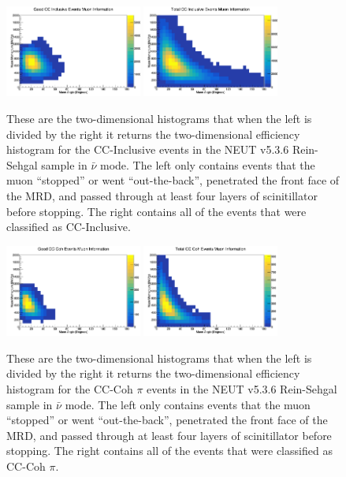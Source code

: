 \documentclass[11pt]{article}
\begin{document}
\begin{figure}[H]
\centering
\includegraphics[width=0.4\textwidth]{NewANMReinSehgalImages/6-GoodCCCohMuonInfoANMRS.png}
\includegraphics[width=0.4\textwidth]{NewANMReinSehgalImages/9-TotalCCCohMuonInfoANMRS.png}
\caption{These are the two-dimensional histograms that when the left is divided by the right it returns the two-dimensional efficiency histogram for the CC-Inclusive events in the NEUT v5.3.6 Rein-Sehgal sample in $\bar{\nu}$ mode. The left only contains events that the muon ``stopped'' or went ``out-the-back'', penetrated the front face of the MRD, and passed through at least four layers of scinitillator before stopping. The right contains all of the events that were classified as CC-Inclusive.}
\label{fig:app:ANMCCInclusiveMuon2DRS}
\end{figure}

\begin{figure}[H]
\centering
\includegraphics[width=0.4\textwidth]{NewANMReinSehgalImages/7.png}
\includegraphics[width=0.4\textwidth]{NewANMReinSehgalImages/8.png}
\caption{These are the two-dimensional histograms that when the left is divided by the right it returns the two-dimensional efficiency histogram for the CC-Coh $\pi$ events in the NEUT v5.3.6 Rein-Sehgal sample in $\bar{\nu}$ mode. The left only contains events that the muon ``stopped'' or went ``out-the-back'', penetrated the front face of the MRD, and passed through at least four layers of scinitillator before stopping. The right contains all of the events that were classified as CC-Coh $\pi$.}
\label{fig:app:ANMCCCohMuon2DRS}
\end{figure}
\end{document}
